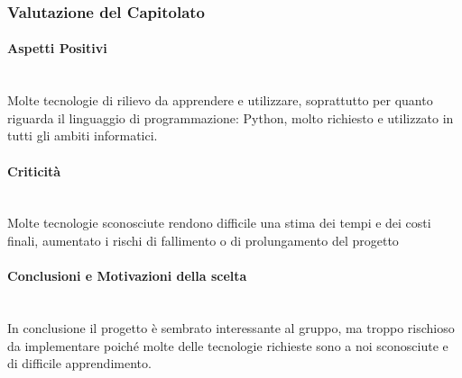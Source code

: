 \subsubsection{Valutazione del Capitolato}

\paragraph{Aspetti Positivi} ~\\
Molte tecnologie di rilievo da apprendere e utilizzare, soprattutto per quanto riguarda il linguaggio di programmazione: Python, molto richiesto e utilizzato in tutti gli ambiti informatici. 

\paragraph{Criticità} ~\\
Molte tecnologie sconosciute rendono difficile una stima dei tempi e dei costi finali, aumentato i rischi di fallimento o di prolungamento del progetto

\paragraph{Conclusioni e Motivazioni della scelta} ~\\
In conclusione il progetto è sembrato interessante al gruppo, ma troppo rischioso da implementare poiché molte delle tecnologie richieste sono a noi sconosciute e di difficile apprendimento. 

